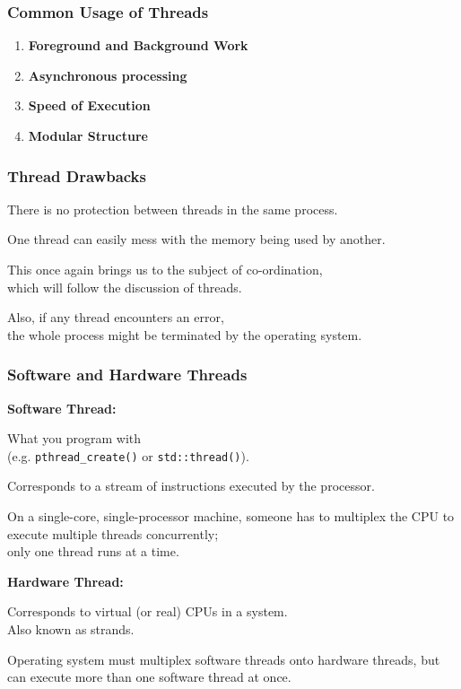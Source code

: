 \begin{frame}
\frametitle{Common Usage of Threads}

\begin{enumerate}
	\item \textbf{Foreground and Background Work}
	\item \textbf{Asynchronous processing}
	\item \textbf{Speed of Execution}
	\item \textbf{Modular Structure}
\end{enumerate}

\end{frame}

\begin{frame}
\frametitle{Thread Drawbacks}

There is no protection between threads in the same process. 

One thread can easily mess with the memory being used by another. 

This once again brings us to the subject of co-ordination, \\
which will follow the discussion of threads.

Also, if any thread encounters an error, \\
the whole process might be terminated by the operating system.

\end{frame}
\begin{frame}
  \frametitle{Software and Hardware Threads}


  {\bf Software Thread:}

  What you program with\\
  \qquad (e.g. {\tt pthread\_create()} or {\tt std::thread()}). \vfill

  Corresponds to a stream of instructions executed by the processor. \vfill

  On a single-core, single-processor machine, someone has to multiplex the CPU to
  execute multiple threads concurrently;\\ only one thread runs at a time.

  \vfill
  {\bf Hardware Thread:}

  Corresponds to virtual (or real) CPUs in a system. \\ Also known as strands. \vfill

  Operating system must multiplex software threads onto hardware threads, but 
  can execute more than one software thread at once.


\end{frame}

